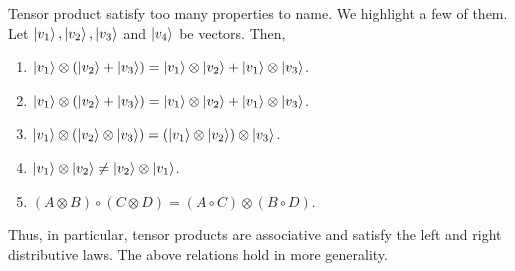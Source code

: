 Tensor product satisfy too many properties to name.  We highlight a few of them. 
Let $\ket{v_1}, \ket{v_2}, \ket{v_3}$ and $\ket{v_4}$ be vectors.  Then,
\begin{enumerate}
    \item $\ket{v_1} \otimes (\ket{v_2}+\ket{v_3})=\ket{v_1} \otimes \ket{v_2} + \ket{v_1} \otimes \ket{v_3}$.
    \item $\ket{v_1} \otimes (\ket{v_2}+\ket{v_3})=\ket{v_1} \otimes \ket{v_2} + \ket{v_1} \otimes \ket{v_3}$.
    \item $\ket{v_1} \otimes (\ket{v_2} \otimes \ket{v_3})=(\ket{v_1} \otimes \ket{v_2}) \otimes \ket{v_3}$.
    \item $\ket{v_1} \otimes \ket{v_2} \ne \ket{v_2} \otimes \ket{v_1}$.
    \item $(A \otimes B)\circ(C \otimes D)=(A \circ C) \otimes (B \circ D)$.
\end{enumerate}
Thus, in particular, tensor products are associative and satisfy the left and right distributive laws.  The above relations hold in more generality.   
